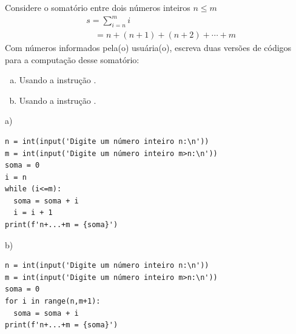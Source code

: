 \begin{exer}
  Considere o somatório entre dois números inteiros $n \leq m$
  \begin{align}
    & s = \sum_{i=n}^m i \\
    & \text{}\quad = n + (n+1) + (n+2) + \cdots + m
  \end{align}
  Com números informados pela(o) usuária(o), escreva duas versões de códigos para a computação desse somatório:
  \begin{enumerate}[a)]
  \item Usando a instrução {\PYTHONwhile}.
  \item Usando a instrução {\PYTHONfor}.
  \end{enumerate}
\end{exer}
\begin{resp}
a)

\begin{lstlisting}
n = int(input('Digite um número inteiro n:\n'))
m = int(input('Digite um número inteiro m>n:\n'))
soma = 0
i = n
while (i<=m):
  soma = soma + i
  i = i + 1
print(f'n+...+m = {soma}')
\end{lstlisting}

b)

\begin{lstlisting}
n = int(input('Digite um número inteiro n:\n'))
m = int(input('Digite um número inteiro m>n:\n'))
soma = 0
for i in range(n,m+1):
  soma = soma + i
print(f'n+...+m = {soma}')
\end{lstlisting}

\end{resp}

